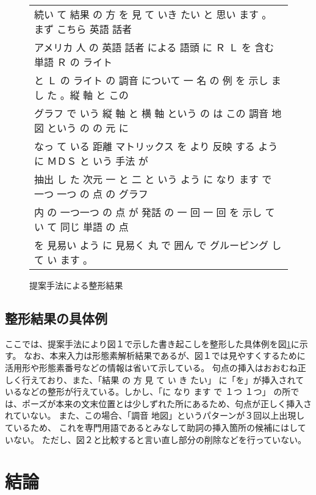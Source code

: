 \begin{figure}[t]
\small
\begin{center}
\begin{tabular}{l}
\hline
続い て 結果 の 方 を 見 て いき たい と 思い ます 。 まず こちら 英語 話者 \\
アメリカ 人 の 英語 話者 による 語頭 に Ｒ Ｌ を 含む 単語 Ｒ の ライト \\
と Ｌ の ライト の 調音 について 一 名 の 例 を 示し まし た 。縦 軸 と この \\
グラフ で いう 縦 軸 と 横 軸 という の は この 調音 地図 という の の 元 に \\
なっ て いる 距離 マトリックス を より 反映 する よう に ＭＤＳ と いう 手法 が \\
抽出 し た 次元 一 と 二 と いう よう に なり ます で 一つ 一つ の 点 の グラフ \\
内 の 一つ一つ の 点 が 発話 の 一 回 一 回 を 示し て い て 同じ 単語 の 点 \\
を 見易い よう に 見易く 丸 で 囲ん で グルーピング し て い ます 。\\

\hline
\end{tabular}
\caption{提案手法による整形結果}
\label{output}
\end{center}
\vspace{-1.0mm}
\end{figure}

\subsection{整形結果の具体例}

ここでは、提案手法により図１で示した書き起こしを整形した具体例を図\ref{output}に示す。
なお、本来入力は形態素解析結果であるが、図１では見やすくするために
活用形や形態素番号などの情報は省いて示している。
句点の挿入はおおむね正しく行えており、また、「結果 の 方 見 て い き たい」
に「を」が挿入されているなどの整形が行えている。しかし、「に なり ます で １つ １つ」
の所では、ポーズが本来の文末位置とは少しずれた所にあるため、句点が正しく挿入されていない。
また、この場合、「調音 地図」というパターンが３回以上出現しているため、
これを専門用語であるとみなして助詞の挿入箇所の候補にはしていない。
ただし、図２と比較すると言い直し部分の削除などを行っていない。

\section{結論}

